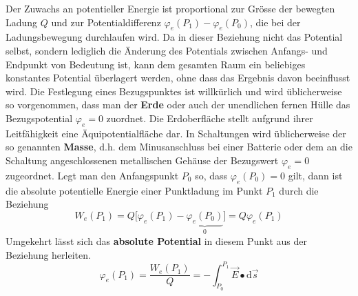 Der Zuwachs an potentieller Energie ist proportional zur Grösse der bewegten Ladung $Q$ und zur Potentialdifferenz $\varphi_e\left(P_1\right)-\varphi_e\left(P_0\right)$, die bei der Ladungsbewegung durchlaufen wird. Da in dieser Beziehung nicht das Potential selbst, sondern lediglich die Änderung des Potentials zwischen Anfangs- und Endpunkt von Bedeutung ist, kann dem gesamten Raum ein beliebiges konstantes Potential überlagert werden, ohne dass das Ergebnis davon beeinflusst wird. 
\newline\newline
Die Festlegung eines Bezugspunktes ist willkürlich und wird üblicherweise so vorgenommen, dass man der \textbf{Erde} oder auch der unendlichen fernen Hülle das Bezugspotential $\varphi_e=0$ zuordnet. Die Erdoberfläche stellt aufgrund ihrer Leitfähigkeit eine Äquipotentialfläche dar. In Schaltungen wird üblicherweise der so genannten \textbf{Masse}, d.h. dem Minusanschluss bei einer Batterie oder dem an die Schaltung angeschlossenen metallischen Gehäuse der Bezugswert $\varphi_e=0$ zugeordnet.
\newline\newline
Legt man den Anfangspunkt $P_0$ so, dass $\varphi_e\left(P_0\right)=0$ gilt, dann ist die absolute potentielle Energie einer Punktladung im Punkt $P_1$ durch die Beziehung
\begin{equation}
\boxed{W_e\left(P_1\right)=Q\Big[\varphi_e\left(P_1\right)-\underbrace{\varphi_e\left(P_0\right)}_{0}\Big]=Q\varphi_e\left(P_1\right)}
\end{equation}
Umgekehrt lässt sich das \textbf{absolute Potential} in diesem Punkt aus der Beziehung herleiten.
\begin{equation}
\boxed{\varphi_e\left(P_1\right)=\dfrac{W_e\left(P_1\right)}{Q}=-\displaystyle \int_{P_0}^{P_1}\overrightarrow{E}\bullet \text{d}\overrightarrow{s}}
\end{equation}
